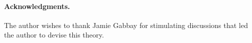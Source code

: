\paragraph{Acknowledgments.}
The author wishes to thank Jamie Gabbay for stimulating discussions
that led the author to devise this theory.
